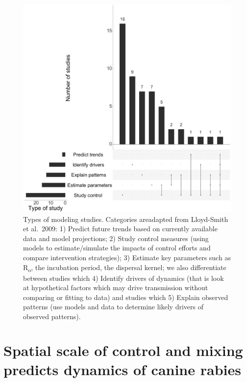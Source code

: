 \documentclass[
  oneside]{book}
\begin{document}
\begin{figure}
\includegraphics[width=0.8\linewidth]{figs/ch3/image5} \caption[Types of canine rabies modeling studies.]{Types of modeling studies. Categories areadapted from Lloyd-Smith et al.~2009: 1) Predict future trends based on
currently available data and model projections; 2) Study control
measures (using models to estimate/simulate the impacts of control
efforts and compare intervention strategies); 3) Estimate key parameters
such as R\textsubscript{o}, the incubation period, the dispersal kernel; we also
differentiate between studies which 4) Identify drivers of dynamics
(that is look at hypothetical factors which may drive transmission\emph{
}without comparing or fitting to data) and studies which 5) Explain
observed patterns (use models and data to determine likely drivers of
observed patterns).}\label{fig:figS2}
\end{figure}












\hypertarget{spatial-scale-of-control-and-mixing-predicts-dynamics-of-canine-rabies}{%
\chapter{Spatial scale of control and mixing predicts dynamics of canine rabies}\label{spatial-scale-of-control-and-mixing-predicts-dynamics-of-canine-rabies}}
\end{document}

